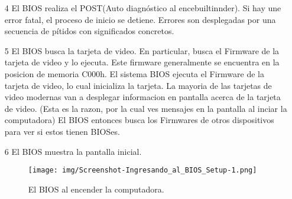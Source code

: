 \documentclass[12pt,oneside,a4paper]{article}
\begin{document}
\begin{enumerate}
	
		\item[4] El BIOS realiza el POST(Auto diagnóstico al encebuiltinnder). Si hay une
			error fatal, el proceso de inicio se detiene. Errores son desplegadas
			por una secuencia de pítidos con significados concretos.
	

		\item[5] El BIOS busca la tarjeta de video. En particular, busca el
			Firmware de la tarjeta de video y lo ejecuta. Este firmware
			generalmente se encuentra en la posicion de memoria C000h.  El
			sistema BIOS ejecuta el Firmware de la tarjeta de video, lo cual
			inicializa la tarjeta. La mayoria de las tarjetas de video modernas
			van a desplegar informacion en pantalla acerca de la tarjeta de
			video. (Esta es la razon, por la cual ves mensajes en la pantalla
			al inciar la computadora) El BIOS entonces busca los Firmwares de
			otros dispositivos para ver si estos tienen BIOSes.
				
		\item[6] El BIOS muestra la pantalla inicial.
			\begin{figure}[H]
				\centering
					\texttt{[image: img/Screenshot-Ingresando\_al\_BIOS\_Setup-1.png]}
				\caption{El BIOS al encender la computadora.}
			\end{figure}
	


\end{enumerate}
\end{document}
